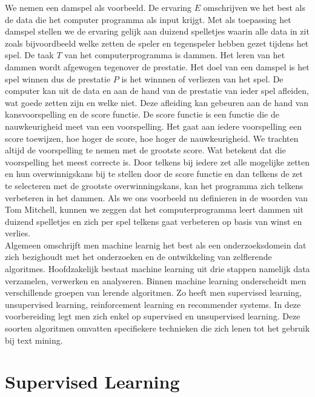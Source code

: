 We nemen een damspel als voorbeeld. De ervaring $E$ omschrijven we het best als de data die het computer programma als input krijgt. Met als toepassing het damspel stellen we de ervaring gelijk aan duizend spelletjes waarin alle data in zit zoals bijvoordbeeld welke zetten de speler en tegenspeler hebben gezet tijdens het spel. De taak $T$ van het computerprogramma is dammen. Het leren van het dammen wordt afgewogen tegenover de prestatie. Het doel van een damspel is het spel winnen dus de prestatie $P$ is het winnnen of verliezen van het spel. De computer kan uit de data en aan de hand van de prestatie van ieder spel afleiden, wat goede zetten zijn en welke niet. Deze afleiding kan gebeuren aan de hand van kansvoorspelling en de score functie. De score functie is een functie die de nauwkeurigheid meet van een voorspelling. Het gaat aan iedere voorspelling een score toewijzen, hoe hoger de score, hoe hoger de nauwkeurigheid. We trachten altijd  de voorspelling te nemen met de grootste score. Wat betekent dat die voorspelling het meest correcte is. Door telkens bij iedere zet alle mogelijke zetten en hun overwinnigskans bij te stellen door de score functie en dan telkens de zet te selecteren met de grootste overwinningskans, kan het programma zich telkens verbeteren in het dammen. Als we ons voorbeeld nu definieren in de woorden van Tom Mitchell, kunnen we zeggen dat het computerprogramma leert dammen uit duizend spelletjes en zich per spel telkens gaat verbeteren op basis van winst en verlies.\\    
Algemeen omschrijft men machine learnig het best als een onderzoeksdomein dat zich bezighoudt met het onderzoeken en de ontwikkeling van zelflerende algoritmes. Hoofdzakelijk bestaat machine learning uit drie stappen namelijk data verzamelen, verwerken en analyseren.
\newline
Binnen machine learning onderscheidt men verschillende groepen van lerende algoritmen. Zo heeft men supervised learning, unsupervised learning, reinforcement learning en recommender systems. In deze voorbereiding legt men zich enkel op supervised en unsupervised learning. Deze soorten algoritmen omvatten specifiekere technieken die zich lenen tot het gebruik bij text mining.


\section{Supervised Learning}\label{Supervised Learning}

